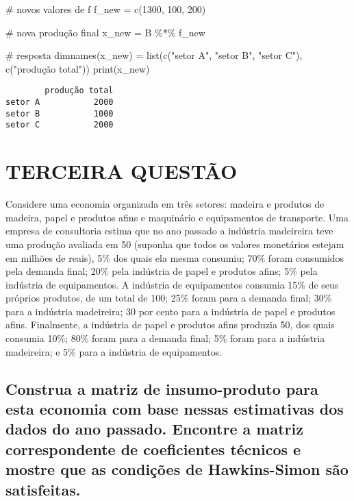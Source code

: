 \documentclass[
  letterpaper,
  DIV=11,
  numbers=noendperiod]{scrreprt}
\newenvironment{Shaded}{\begin{snugshade}}{\end{snugshade}}
\newcommand{\CommentTok}[1]{\textcolor[rgb]{0.50,0.62,0.50}{#1}}
\newcommand{\DecValTok}[1]{\textcolor[rgb]{0.86,0.86,0.80}{#1}}
\newcommand{\FunctionTok}[1]{\textcolor[rgb]{0.94,0.94,0.56}{#1}}
\newcommand{\NormalTok}[1]{\textcolor[rgb]{0.80,0.80,0.80}{#1}}
\newcommand{\OtherTok}[1]{\textcolor[rgb]{0.94,0.94,0.56}{#1}}
\newcommand{\SpecialCharTok}[1]{\textcolor[rgb]{0.86,0.64,0.64}{#1}}
\newcommand{\StringTok}[1]{\textcolor[rgb]{0.80,0.58,0.58}{#1}}
\begin{document}
\begin{Shaded}
\begin{Highlighting}[numbers=left,,]
\CommentTok{\# novos valores de f}
\NormalTok{f\_new }\OtherTok{=} \FunctionTok{c}\NormalTok{(}\DecValTok{1300}\NormalTok{, }\DecValTok{100}\NormalTok{, }\DecValTok{200}\NormalTok{)}

\CommentTok{\# nova produção final}
\NormalTok{x\_new }\OtherTok{=}\NormalTok{ B }\SpecialCharTok{\%*\%}\NormalTok{ f\_new}

\CommentTok{\# resposta}
\FunctionTok{dimnames}\NormalTok{(x\_new) }\OtherTok{=} \FunctionTok{list}\NormalTok{(}\FunctionTok{c}\NormalTok{(}\StringTok{"setor A"}\NormalTok{, }\StringTok{"setor B"}\NormalTok{, }\StringTok{"setor C"}\NormalTok{), }\FunctionTok{c}\NormalTok{(}\StringTok{"produção total"}\NormalTok{))}
\FunctionTok{print}\NormalTok{(x\_new)}
\end{Highlighting}
\end{Shaded}

\begin{verbatim}
        produção total
setor A           2000
setor B           1000
setor C           2000
\end{verbatim}

\chapter{TERCEIRA QUESTÃO}\label{terceira-questuxe3o}

Considere uma economia organizada em três setores: madeira e produtos de
madeira, papel e produtos afins e maquinário e equipamentos de
transporte. Uma empresa de consultoria estima que no ano passado a
indústria madeireira teve uma produção avaliada em 50 (suponha que todos
os valores monetários estejam em milhões de reais), 5\% dos quais ela
mesma consumiu; 70\% foram consumidos pela demanda final; 20\% pela
indústria de papel e produtos afins; 5\% pela indústria de equipamentos.
A indústria de equipamentos consumia 15\% de seus próprios produtos, de
um total de 100; 25\% foram para a demanda final; 30\% para a indústria
madeireira; 30 por cento para a indústria de papel e produtos afins.
Finalmente, a indústria de papel e produtos afins produzia 50, dos quais
consumia 10\%; 80\% foram para a demanda final; 5\% foram para a
indústria madeireira; e 5\% para a indústria de equipamentos.

\section{Construa a matriz de insumo-produto para esta economia com base
nessas estimativas dos dados do ano passado. Encontre a matriz
correspondente de coeficientes técnicos e mostre que as condições de
Hawkins-Simon são
satisfeitas.}\label{construa-a-matriz-de-insumo-produto-para-esta-economia-com-base-nessas-estimativas-dos-dados-do-ano-passado.-encontre-a-matriz-correspondente-de-coeficientes-tuxe9cnicos-e-mostre-que-as-condiuxe7uxf5es-de-hawkins-simon-suxe3o-satisfeitas.}
\end{document}
